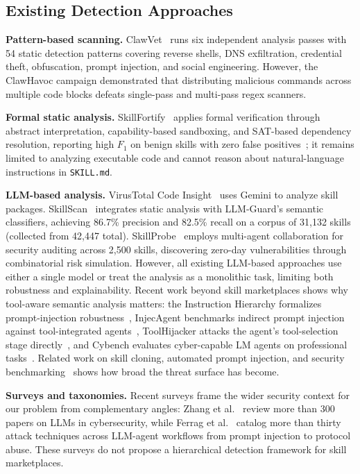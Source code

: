 \documentclass[sigconf,nonacm]{acmart}
\begin{document}
\subsection{Existing Detection Approaches}

\textbf{Pattern-based scanning.} ClawVet~\cite{clawvet2026} runs six independent analysis passes with 54 static detection patterns covering reverse shells, DNS exfiltration, credential theft, obfuscation, prompt injection, and social engineering. However, the ClawHavoc campaign demonstrated that distributing malicious commands across multiple code blocks defeats single-pass and multi-pass regex scanners.

\textbf{Formal static analysis.} SkillFortify~\cite{skillfortify2026} applies formal verification through abstract interpretation, capability-based sandboxing, and SAT-based dependency resolution, reporting high $F_1$ on benign skills with zero false positives~\cite{skillfortify2026}; it remains limited to analyzing executable code and cannot reason about natural-language instructions in \texttt{SKILL.md}.

\textbf{LLM-based analysis.} VirusTotal Code Insight~\cite{virustotal2026} uses Gemini to analyze skill packages. SkillScan~\cite{liu2026agentskillswild} integrates static analysis with LLM-Guard's semantic classifiers, achieving 86.7\% precision and 82.5\% recall on a corpus of 31,132 skills (collected from 42,447 total). SkillProbe~\cite{skillprobe2026} employs multi-agent collaboration for security auditing across 2,500 skills, discovering zero-day vulnerabilities through combinatorial risk simulation. However, all existing LLM-based approaches use either a single model or treat the analysis as a monolithic task, limiting both robustness and explainability. Recent work beyond skill marketplaces shows why tool-aware semantic analysis matters: the Instruction Hierarchy formalizes prompt-injection robustness~\cite{instructionhierarchy2024}, InjecAgent benchmarks indirect prompt injection against tool-integrated agents~\cite{injecagent2024}, ToolHijacker attacks the agent's tool-selection stage directly~\cite{toolhijacker2025}, and Cybench evaluates cyber-capable LM agents on professional tasks~\cite{cybench2024}. Related work on skill cloning, automated prompt injection, and security benchmarking~\cite{skillclone2026, skillject2026, skilltester2026} shows how broad the threat surface has become.

\textbf{Surveys and taxonomies.} Recent surveys frame the wider security context for our problem from complementary angles: Zhang et al.~\cite{llmcybersurvey2025} review more than 300 papers on LLMs in cybersecurity, while Ferrag et al.~\cite{agentworkflowthreats2025} catalog more than thirty attack techniques across LLM-agent workflows from prompt injection to protocol abuse. These surveys do not propose a hierarchical detection framework for skill marketplaces.
\end{document}
